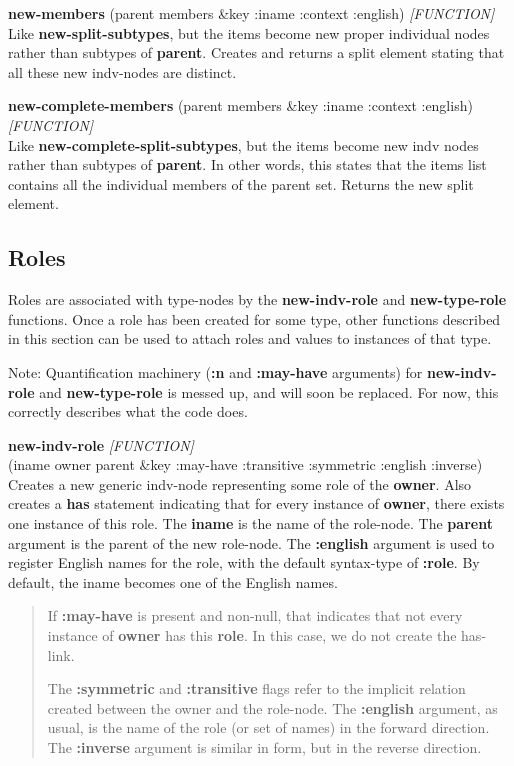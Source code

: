 \documentclass[titlepage,twoside,openright,11pt]{article}
\begin{document}
\textbf{new-members} (parent members \&key :iname :context :english)
\emph{{[}FUNCTION{]}}\\
Like \textbf{new-split-subtypes}, but the items become new proper
individual nodes rather than subtypes of \textbf{parent}. Creates and
returns a split element stating that all these new indv-nodes are
distinct.

\textbf{new-complete-members} (parent members \&key :iname :context
:english) \emph{{[}FUNCTION{]}}\\
Like \textbf{new-complete-split-subtypes}, but the items become new indv
nodes rather than subtypes of \textbf{parent}. In other words, this
states that the items list contains all the individual members of the
parent set. Returns the new split element.

\subsection{Roles}\label{roles}

Roles are associated with type-nodes by the \textbf{new-indv-role} and
\textbf{new-type-role} functions. Once a role has been created for some
type, other functions described in this section can be used to attach
roles and values to instances of that type.

Note: Quantification machinery (\textbf{:n} and \textbf{:may-have}
arguments) for \textbf{new-indv-role} and \textbf{new-type-role} is
messed up, and will soon be replaced. For now, this correctly describes
what the code does.

\textbf{new-indv-role} \emph{{[}FUNCTION{]}\\
}(iname owner parent \&key :may-have :transitive :symmetric :english
:inverse)\\
Creates a new generic indv-node representing some role of the
\textbf{owner}. Also creates a \textbf{has} statement indicating that
for every instance of \textbf{owner}, there exists one instance of this
role. The \textbf{iname} is the name of the role-node. The
\textbf{parent} argument is the parent of the new role-node. The
\textbf{:english} argument is used to register English names for the
role, with the default syntax-type of \textbf{:role}. By default, the
iname becomes one of the English names.

\begin{quote}
If \textbf{:may-have} is present and non-null, that indicates that not
every instance of \textbf{owner} has this \textbf{role}. In this case,
we do not create the has-link.

The \textbf{:symmetric} and \textbf{:transitive} flags refer to the
implicit relation created between the owner and the role-node. The
\textbf{:english} argument, as usual, is the name of the role (or set of
names) in the forward direction. The \textbf{:inverse} argument is
similar in form, but in the reverse direction.
\end{quote}
\end{document}
